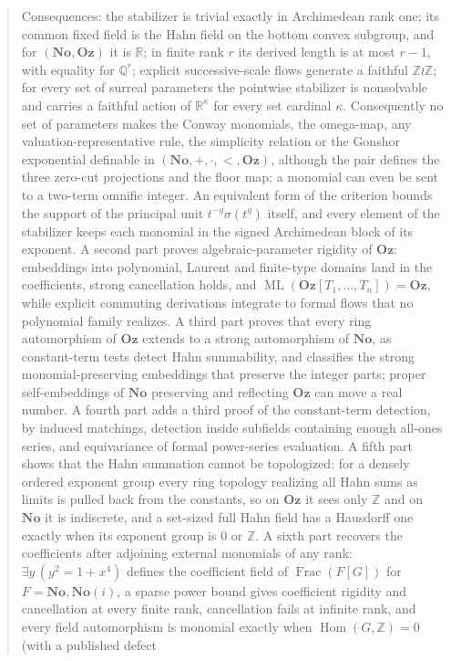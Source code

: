 \documentclass[11pt,oneside]{article}
\numberwithin{equation}{section}
\theoremstyle{definition}
\theoremstyle{remark}
\newcommand{\No}{\mathbf{No}}
\newcommand{\Oz}{\mathbf{Oz}}
\newcommand{\SC}{\mathbf{No}(i)}
\newcommand{\R}{\mathbb R}
\newcommand{\Q}{\mathbb Q}
\newcommand{\Z}{\mathbb Z}
\newcommand{\Hom}{\operatorname{Hom}}
\newcommand{\Frac}{\operatorname{Frac}}
\newcommand{\ML}{\operatorname{ML}}
\begin{document}
\begin{titlepage}
\begin{minipage}{\textwidth}
\begin{abstract}
Consequences: the stabilizer is trivial exactly in Archimedean rank one; its
common fixed field is the Hahn field on the bottom convex subgroup, and for
$(\No,\Oz)$ it is $\R$; in finite rank $r$ its derived length is at most
$r-1$, with equality for $\Q^r$; explicit successive-scale flows generate a
faithful $\Z\wr\Z$; for every set of surreal parameters the pointwise
stabilizer is nonsolvable and carries a faithful action of $\R^\kappa$ for
every set cardinal $\kappa$. Consequently no set of parameters makes the
Conway monomials, the omega-map, any valuation-representative rule, the
simplicity relation or the Gonshor exponential definable in
$(\No,+,\cdot,<,\Oz)$, although the pair defines the three zero-cut
projections and the floor map; a monomial can even be sent to a two-term
omnific integer. An equivalent form of the criterion bounds the support of
the principal unit $t^{-g}\sigma(t^g)$ itself, and every element of the
stabilizer keeps each monomial in the signed Archimedean block of its
exponent. A second part proves
algebraic-parameter rigidity of $\Oz$: embeddings into polynomial, Laurent and
finite-type domains land in the coefficients, strong cancellation holds, and
$\ML(\Oz[T_1,\dots,T_n])=\Oz$, while explicit commuting derivations integrate
to formal flows that no polynomial family realizes. A third part proves that
every ring automorphism of $\Oz$ extends to a strong automorphism of $\No$, as
constant-term tests detect Hahn summability, and classifies the strong
monomial-preserving embeddings that preserve the integer parts; proper
self-embeddings of $\No$ preserving and reflecting $\Oz$ can move a real number.
A fourth part adds a third proof of the constant-term detection, by induced
matchings, detection inside subfields containing enough all-ones series, and
equivariance of formal power-series evaluation. A fifth part shows that the Hahn
summation cannot be topologized: for a densely ordered exponent group every ring
topology realizing all Hahn sums as limits is pulled back from the constants, so
on $\Oz$ it sees only $\Z$ and on $\No$ it is indiscrete, and a set-sized full
Hahn field has a Hausdorff one exactly when its exponent group is $0$ or $\Z$. A
sixth part recovers the coefficients after adjoining external monomials of any
rank: $\exists y\,(y^2=1+x^4)$ defines the coefficient field of $\Frac(F[G])$ for
$F=\No,\SC$, a sparse power bound gives coefficient rigidity and cancellation at
every finite rank, cancellation fails at infinite rank, and every field
automorphism is monomial exactly when $\Hom(G,\Z)=0$ (with a published defect

\end{abstract}
\end{minipage}
\end{titlepage}
\end{document}
